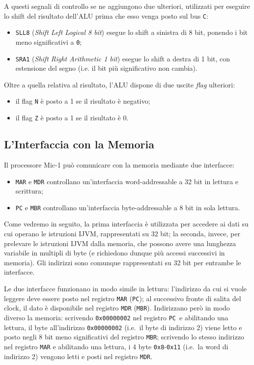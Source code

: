 \documentclass[a4paper,12pt]{scrreprt}
\begin{document}
A questi segnali di controllo se ne aggiungono due ulteriori, utilizzati per
eseguire lo shift del risultato dell'ALU prima che esso venga posto sul bus
\lstinline{C}:
\begin{itemize}
  \item \lstinline{SLL8} (\textit{Shift Left Logical 8 bit}) esegue lo shift a
  sinistra di 8 bit, ponendo i bit meno significativi a \lstinline{0};
  \item \lstinline{SRA1} (\textit{Shift Right Arithmetic 1 bit}) esegue lo shift
  a destra di 1 bit, con estensione del segno (i.e. il bit più significativo non
  cambia).
\end{itemize}

Oltre a quella relativa al risultato, l'ALU dispone di due uscite \textit{flag}
ulteriori:
\begin{itemize}
  \item il flag \lstinline{N} è posto a 1 se il risultato è negativo;
  \item il flag \lstinline{Z} è posto a 1 se il risultato è 0.
\end{itemize}

\subsection{L'Interfaccia con la Memoria}

Il processore Mic-1 può comunicare con la memoria mediante due interfacce:
\begin{itemize}
  \item \lstinline{MAR} e \lstinline{MDR} controllano un'interfaccia
  word-addressable a 32 bit in lettura e scrittura;
  \item \lstinline{PC} e \lstinline{MBR} controllano un'interfaccia
  byte-addressable a 8 bit in sola lettura.
\end{itemize}

\begin{mynote}{}{}
  Come vedremo in seguito, la prima interfaccia è utilizzata per accedere ai
  dati su cui operano le istruzioni IJVM, rappresentati su 32 bit; la seconda,
  invece, per prelevare le istruzioni IJVM dalla memoria, che possono avere una
  lunghezza variabile in multipli di byte (e richiedono dunque più accessi
  successivi in memoria). Gli indirizzi sono comunque rappresentati su 32 bit
  per entrambe le interfacce.
\end{mynote}

Le due interfacce funzionano in modo simile in lettura: l'indirizzo da cui si
vuole leggere deve essere posto nel registro \lstinline{MAR} (\lstinline{PC});
al successivo fronte di salita del clock, il dato è disponibile nel registro
\lstinline{MDR} (\lstinline{MBR}). Indirizzano però in modo diverso la memoria:
scrivendo \lstinline{0x00000002} nel registro \lstinline{PC} e abilitando una
lettura, il byte all'indirizzo \lstinline{0x00000002} (i.e.~il byte di indirizzo
2) viene letto e posto negli 8 bit meno significativi del registro
\lstinline{MBR}; scrivendo lo stesso indirizzo nel registro \lstinline{MAR} e
abilitando una lettura, i 4 byte \lstinline{0x8}-\lstinline{0x11} (i.e.~la word
di indirizzo 2) vengono letti e posti nel registro \lstinline{MDR}.
\end{document}
